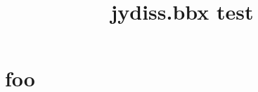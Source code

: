 \documentclass[english,utf8]{jydiss}
\title{jydiss.bbx test}
\begin{document}
\mainmatter

\chapter{foo}

\parencite{isaacson65:_psych}
\parencite{niiniluoto80:_johdat_tieten_filos}
\parencite{vaisala67:_keskik_geomet}

\parencite{jaakkola70:_huumaus_suomes}
\parencite{pulkkinen82:_self_contr_and_contin_from}

\parencite{morgan83:_learn_and_studen_life_qualit}
\parencite{ekorre79:_nuoris_luvun_tavoit}
\parencite{haavio-mannila82:_laatu_ja}

\parencite{hurme78:_life_event_resear}
\parencite{karvonen70:_opett_asent_odotuk_ja_oppim_jatkok_i}
\parencite{nummenmaa64:_languag_of_face}

\parencite{beijer69:_huumausaineiden}
\parencite{kivinen71:_huumaus_nuort_ja_sosiaal}
\parencite{olkinuora71:_kansa_ja_kansal_opetus_ja}

\parencite{bib:Glover1989a,bib:Glover1989b}
\parencite{bib:Apolloni2008}
\parencite{bib:DeFalco2007,bib:DeFalco2007b,bib:DeFalco2007c}

\textcite{bib:Garcia2008a,bib:Garcia2008}

\textcite{inoue05:_commun}
\textcite{alasmaa03:_aikam_amats}
\textcite{bergin97:_hopl_ii}

\printbibliography
\end{document}
